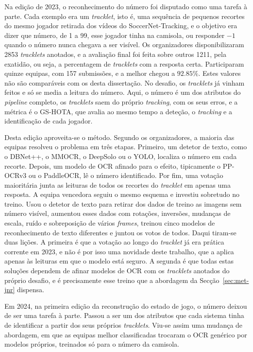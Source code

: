 Na edição de 2023, o reconhecimento do número foi disputado como uma tarefa à parte. Cada exemplo era um \emph{tracklet}, isto é, uma sequência de pequenos recortes do mesmo jogador retirada dos vídeos do SoccerNet-Tracking, e o objetivo era dizer que número, de 1 a 99, esse jogador tinha na camisola, ou responder $-1$ quando o número nunca chegava a ser visível. Os organizadores disponibilizaram 2853 \emph{tracklets} anotados, e a avaliação final foi feita sobre outros 1211, pela exatidão, ou seja, a percentagem de \emph{tracklets} com a resposta certa. Participaram quinze equipas, com 157 submissões, e a melhor chegou a $92{.}85\%$. Estes valores não são comparáveis com os desta dissertação. No desafio, os \emph{tracklets} já vinham feitos e só se media a leitura do número. Aqui, o número é um dos atributos do \emph{pipeline} completo, os \emph{tracklets} saem do próprio \emph{tracking}, com os seus erros, e a métrica é o GS-HOTA, que avalia ao mesmo tempo a deteção, o \emph{tracking} e a identificação de cada jogador.

Desta edição aproveita-se o método. Segundo os organizadores, a maioria das equipas resolveu o problema em três etapas. Primeiro, um detetor de texto, como o DBNet++, o MMOCR, o DeepSolo ou o YOLO, localiza o número em cada recorte. Depois, um modelo de OCR afinado para o efeito, tipicamente o PP-OCRv3 ou o PaddleOCR, lê o número identificado. Por fim, uma votação maioritária junta as leituras de todos os recortes do \emph{tracklet} em apenas uma resposta. A equipa vencedora seguiu o mesmo esquema e investiu sobretudo no treino. Usou o detetor de texto para retirar dos dados de treino as imagens sem número visível, aumentou esses dados com rotações, inversões, mudanças de escala, ruído e sobreposição de vários \emph{frames}, treinou cinco modelos de reconhecimento de texto diferentes e juntou os votos de todos. Daqui tiram-se duas lições. A primeira é que a votação ao longo do \emph{tracklet} já era prática corrente em 2023, e não é por isso uma novidade deste trabalho, que a aplica apenas às leituras em que o modelo está seguro. A segunda é que todas estas soluções dependem de afinar modelos de OCR com os \emph{tracklets} anotados do próprio desafio, e é precisamente esse treino que a abordagem da Secção~\ref{sec:met-jnr} dispensa.


Em 2024, na primeira edição da reconstrução do estado de jogo, o número deixou de ser uma tarefa à parte. Passou a ser um dos atributos que cada sistema tinha de identificar a partir dos seus próprios \emph{tracklets}. Viu-se assim uma mudança de abordagem, em que as equipas melhor classificadas trocaram o OCR genérico por modelos próprios, treinados só para o número da camisola.

